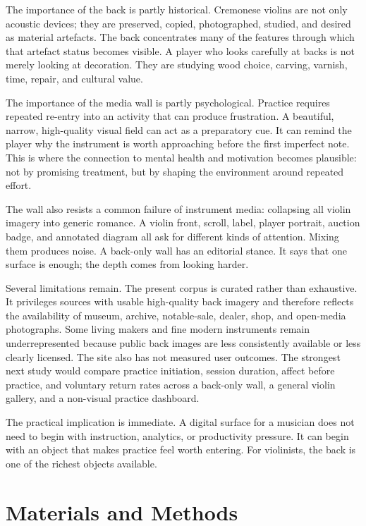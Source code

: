 \documentclass[12pt,letterpaper]{article}
\begin{document}
The importance of the back is partly historical. Cremonese violins are not only acoustic devices; they are preserved, copied, photographed, studied, and desired as material artefacts. The back concentrates many of the features through which that artefact status becomes visible. A player who looks carefully at backs is not merely looking at decoration. They are studying wood choice, carving, varnish, time, repair, and cultural value.

The importance of the media wall is partly psychological. Practice requires repeated re-entry into an activity that can produce frustration. A beautiful, narrow, high-quality visual field can act as a preparatory cue. It can remind the player why the instrument is worth approaching before the first imperfect note. This is where the connection to mental health and motivation becomes plausible: not by promising treatment, but by shaping the environment around repeated effort.

The wall also resists a common failure of instrument media: collapsing all violin imagery into generic romance. A violin front, scroll, label, player portrait, auction badge, and annotated diagram all ask for different kinds of attention. Mixing them produces noise. A back-only wall has an editorial stance. It says that one surface is enough; the depth comes from looking harder.

Several limitations remain. The present corpus is curated rather than exhaustive. It privileges sources with usable high-quality back imagery and therefore reflects the availability of museum, archive, notable-sale, dealer, shop, and open-media photographs. Some living makers and fine modern instruments remain underrepresented because public back images are less consistently available or less clearly licensed. The site also has not measured user outcomes. The strongest next study would compare practice initiation, session duration, affect before practice, and voluntary return rates across a back-only wall, a general violin gallery, and a non-visual practice dashboard.

The practical implication is immediate. A digital surface for a musician does not need to begin with instruction, analytics, or productivity pressure. It can begin with an object that makes practice feel worth entering. For violinists, the back is one of the richest objects available.

\clearpage
\section{Materials and Methods}
\end{document}
